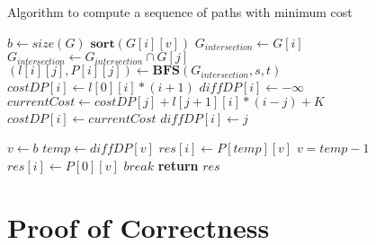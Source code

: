 \documentclass{article}
\begin{document}
\begin{algorithm}
\caption{Algorithm to compute a sequence of paths with minimum cost}\label{euclid}
\begin{algorithmic}[1]
 
    \State $b \gets size(G)$
            \State $\textbf{sort}(G[i][v])$
        \EndFor
    \EndFor
        \State $G_{intersection} \gets G[i]$
            \State $G_{intersection} \gets G_{intersection}\cap G[j]$
            \State $(l[i][j],P[i][j] ) \gets \textbf{BFS}(G_{intersection},s,t)$
        \EndFor
     \EndFor
        \State $costDP[i] \gets l[0][i]*(i+1)$
        \State $diffDP[i] \gets -\infty$
            \State $currentCost \gets costDP[j]+l[j+1][i]*(i-j)+K$
                \State $costDP[i] \gets currentCost$
                \State $diffDP[i] \gets j$
            \EndIf
        \EndFor
     \EndFor
     
    \State $v \gets b$
        \State $temp \gets diffDP[v]$
                \State $res[i] \gets P[temp][v]$
            \EndFor
            \State $v=temp-1$
        \Else
                \State $res[i] \gets P[0][v]$
            \EndFor
            \State $break$
        \EndIf
    \EndWhile
    \State \textbf{return} $res$
\EndProcedure
\end{algorithmic}
\end{algorithm}


\section {Proof of Correctness}
\end{document}
